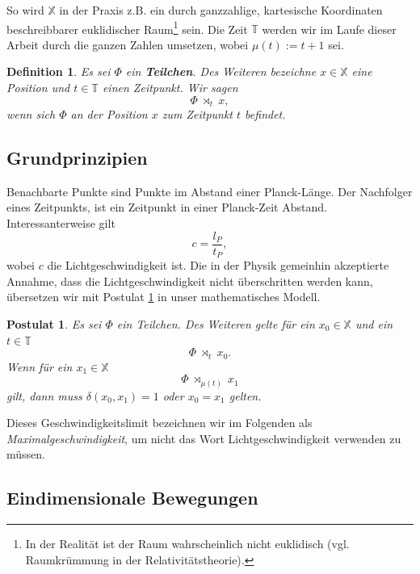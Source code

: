 \documentclass[a4paper,12pt,ngerman]{scrartcl}
\theoremstyle{plain}
\newtheorem{definition}{Definition}
\theoremstyle{plain}
\theoremstyle{plain}
\newtheorem{postulate}{Postulat}
\theoremstyle{plain}
\newcommand{\T}{\mathbb{T}}
\newcommand{\X}{\mathbb{X}}
\newcommand{\at}[1]{\;\rtimes_{#1}\;}
\begin{document}
So wird $\X$ in der Praxis z.B. ein durch ganzzahlige, kartesische Koordinaten beschreibbarer euklidischer Raum\footnote{In der Realität ist der Raum wahrscheinlich nicht euklidisch (vgl. Raumkrümmung in der Relativitätstheorie).} sein. Die Zeit $\T$ werden wir im Laufe dieser Arbeit durch die ganzen Zahlen umsetzen, wobei $\mu(t):=t+1$ sei.



\begin{definition}
Es sei $\Phi$ ein \textbf{Teilchen}. Des Weiteren bezeichne $x\in\X$ eine Position und $t\in\T$ einen Zeitpunkt. Wir sagen
\[\Phi \at{t} x,\]
wenn sich $\Phi$ an der Position $x$ zum Zeitpunkt $t$ befindet.
\end{definition}

\subsection{Grundprinzipien}

Benachbarte Punkte sind Punkte im Abstand einer Planck-Länge. %
Der Nachfolger eines Zeitpunkts, ist ein Zeitpunkt in einer Planck-Zeit Abstand. Interessanterweise gilt
\[c=\frac{l_P}{t_P},\]
wobei $c$ die Lichtgeschwindigkeit ist. Die in der Physik gemeinhin akzeptierte Annahme, dass die Lichtgeschwindigkeit nicht überschritten werden kann, übersetzen wir mit Postulat \ref{pos_lightspeed} in unser mathematisches Modell.

\begin{postulate}\label{pos_lightspeed}
Es sei $\Phi$ ein Teilchen. Des Weiteren gelte für ein $x_0\in\X$ und ein $t\in\T$
\[\Phi \at{t} x_0.\]
Wenn für ein $x_1\in\X$ 
\[\Phi \at{\mu(t)} x_1\]
gilt, dann muss $\delta(x_0,x_1)=1$ oder $x_0=x_1$ gelten.
\end{postulate}

Dieses Geschwindigkeitslimit bezeichnen wir im Folgenden als \textit{Maximalgeschwindigkeit}, um nicht das Wort Lichtgeschwindigkeit verwenden zu müssen.

\subsection{Eindimensionale Bewegungen}
\end{document}
